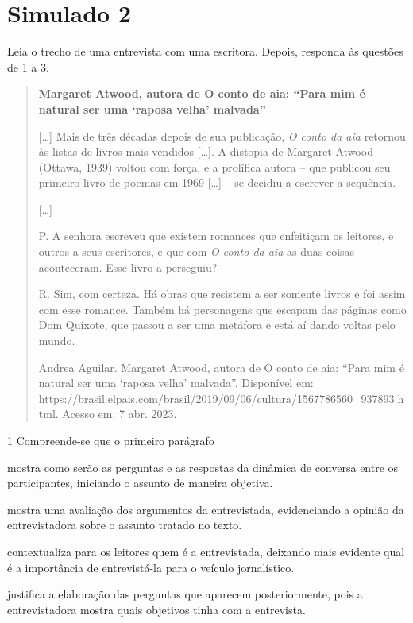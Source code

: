 \chapter{Simulado 2}

Leia o trecho de uma entrevista com uma escritora. Depois, responda às
questões de 1 a 3.

\begin{quote}
\textbf{Margaret Atwood, autora de O conto de aia: ``Para mim é natural
ser uma `raposa velha' malvada''}

{[}\ldots{}{]} Mais de três décadas depois de sua publicação, \emph{O
conto da aia} retornou às listas de livros mais vendidos {[}\ldots{}{]}.
A distopia de Margaret Atwood (Ottawa, 1939) voltou com força, e a
prolífica autora -- que publicou seu primeiro livro de poemas em 1969
{[}\ldots{}{]} -- se decidiu a escrever a sequência.

{[}\ldots{}{]}

P. A senhora escreveu que existem romances que enfeitiçam os leitores, e
outros a seus escritores, e que com \emph{O conto da aia} as duas coisas
aconteceram. Esse livro a perseguiu?

R. Sim, com certeza. Há obras que resistem a ser somente livros e foi
assim com esse romance. Também há personagens que escapam das páginas
como Dom Quixote, que passou a ser uma metáfora e está aí dando voltas
pelo mundo.

Andrea Aguilar. Margaret Atwood, autora de O conto de aia: ``Para mim é
natural ser uma `raposa velha' malvada''. Disponível em:
https://brasil.elpais.com/brasil/2019/09/06/cultura/1567786560\_937893.html.
Acesso em: 7 abr. 2023.
\end{quote}

\num{1} Compreende-se que o primeiro parágrafo

\begin{escolha}
\item mostra como serão as perguntas e as respostas da dinâmica de
conversa entre os participantes, iniciando o assunto de maneira
objetiva.

\item mostra uma avaliação dos argumentos da entrevistada, evidenciando a
opinião da entrevistadora sobre o assunto tratado no texto.

\item contextualiza para os leitores quem é a entrevistada, deixando mais
evidente qual é a importância de entrevistá-la para o veículo
jornalístico.

\item justifica a elaboração das perguntas que aparecem posteriormente,
pois a entrevistadora mostra quais objetivos tinha com a entrevista.
\end{escolha}

